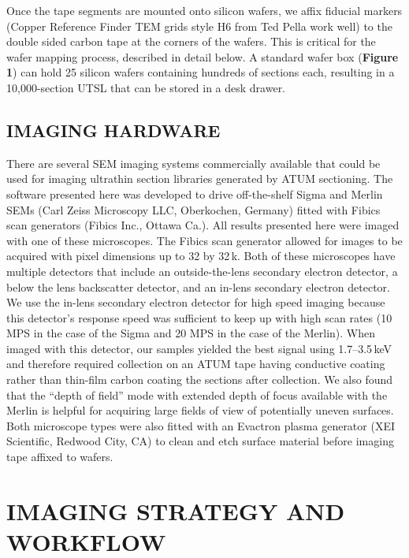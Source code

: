 \documentclass{article}
\begin{document}
Once the tape segments are mounted onto silicon wafers, we affix fiducial markers (Copper Reference Finder TEM grids style H6 from Ted Pella work well) to the double sided carbon tape at the corners of the wafers. This is critical for the wafer mapping process, described in detail below. A standard wafer box (\textbf{Figure 1}) can hold 25 silicon wafers containing hundreds of sections each, resulting in a 10,000-section UTSL that can be stored in a desk drawer.

\subsection*{IMAGING HARDWARE}

There are several SEM imaging systems commercially available that could be used for imaging ultrathin section libraries generated by ATUM sectioning. The software presented here was developed to drive off-the-shelf Sigma and Merlin SEMs (Carl Zeiss Microscopy LLC, Oberkochen, Germany) fitted with Fibics scan generators (Fibics Inc., Ottawa Ca.). All results presented here were imaged with one of these microscopes. The Fibics scan generator allowed for images to be acquired with pixel dimensions up to 32 by 32\,k. Both of these microscopes have multiple detectors that include an outside-the-lens secondary electron detector, a below the lens backscatter detector, and an in-lens secondary electron detector. We use the in-lens secondary electron detector for high speed imaging because this detector’s response speed was sufficient to keep up with high scan rates (10 MPS in the case of the Sigma and 20 MPS in the case of the Merlin). When imaged with this detector, our samples yielded the best signal using 1.7–3.5\,keV and therefore required collection on an ATUM tape having conductive coating rather than thin-film carbon coating the sections after collection. We also found that the “depth of field” mode with extended depth of focus available with the Merlin is helpful for acquiring large fields of view of potentially uneven surfaces. Both microscope types were also fitted with an Evactron plasma generator (XEI Scientific, Redwood City, CA) to clean and etch surface material before imaging tape affixed to wafers.

\section*{IMAGING STRATEGY AND WORKFLOW}
\end{document}
